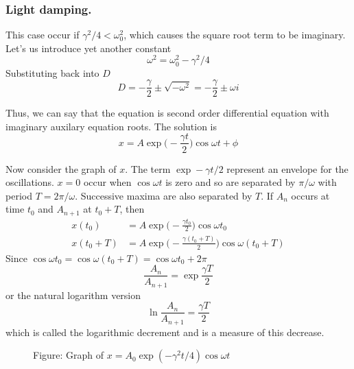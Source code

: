 \documentclass[../../../main.tex]{subfiles}
\begin{document}
\subsubsection{Light damping.} This case occur if $\gamma^2/4<\omega_0^2$, which causes the square root term to be imaginary. Let's us introduce yet another constant
\begin{equation*}
    \omega^2=\omega_0^2-\gamma^2/4
\end{equation*}
Substituting back into $D$
\begin{equation*}
    D=-\frac{\gamma}{2}\pm \sqrt{-\omega^2}=-\frac{\gamma}{2}\pm \omega i
\end{equation*}

Thus, we can say that the equation is second order differential equation with imaginary auxilary equation roots. The solution is
\begin{equation*}
    x=A\exp\biggl(-\frac{\gamma t}{2}\biggr)\cos\omega t +\phi
\end{equation*} 

Now consider the graph of $x$. The term $\exp -\gamma t/2$ represent an envelope for the oscillations. $x=0$ occur when $\cos\omega t$ is zero and so are separated by $\pi/\omega$ with period $T=2\pi/\omega$. Successive maxima are also separated by $T$. If $A_n$ occurs at time $t_0$ and $A_{n+1}$ at $t_0+T$, then 
\begin{align*}
    x(t_0)&=A\exp\biggl(-\frac{\gamma t_0}{2}\biggr)\cos\omega t_0\\
    x(t_0+T)&=A\exp\biggl(-\frac{\gamma (t_0+T)}{2}\biggr)\cos\omega (t_0+T)
\end{align*}
Since $\cos\omega t_0=\cos\omega (t_0+T)=\cos\omega t_0+2\pi$
\begin{equation*}
    \frac{A_n}{A_{n+1}}=\exp \frac{\gamma T}{2}
\end{equation*} 
or the natural logarithm version
\begin{equation*}
    \ln \frac{A_n}{A_{n+1}}=\frac{\gamma T}{2}
\end{equation*}
which is called the logarithmic decrement and is a measure of this decrease. 
\begin{figure}[b]
    \centering
    \caption*{Figure: Graph of $x=A_0\exp(-\gamma^2t/4)\cos \omega t$}
\end{figure}
\end{document}
